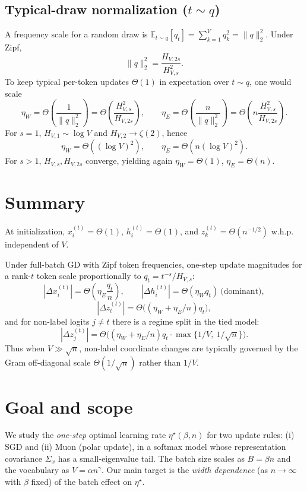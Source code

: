 \documentclass[11pt]{article}
\begin{document}
\subsection{Typical-draw normalization ($t\sim q$)}
A frequency scale for a random draw is $\mathbb{E}_{t\sim q}[q_t]=\sum_{k=1}^V q_k^2=\|q\|_2^2$.
Under Zipf,
\[
\|q\|_2^2 = \frac{H_{V,2s}}{H_{V,s}^2}.
\]
To keep typical per-token updates $\Theta(1)$ in expectation over $t\sim q$, one would scale
\[
\eta_W = \Theta\!\left(\frac{1}{\|q\|_2^2}\right)=\Theta\!\left(\frac{H_{V,s}^2}{H_{V,2s}}\right),
\qquad
\eta_E = \Theta\!\left(\frac{n}{\|q\|_2^2}\right)=\Theta\!\left(n\frac{H_{V,s}^2}{H_{V,2s}}\right).
\]
For $s=1$, $H_{V,1}\sim \log V$ and $H_{V,2}\to \zeta(2)$, hence
\[
\eta_W=\Theta((\log V)^2),\qquad \eta_E=\Theta(n(\log V)^2).
\]
For $s>1$, $H_{V,s},H_{V,2s}$ converge, yielding again $\eta_W=\Theta(1)$, $\eta_E=\Theta(n)$.

\section{Summary}

At initialization, $x^{(t)}_i=\Theta(1)$, $h^{(t)}_i=\Theta(1)$, and $z^{(t)}_k=\Theta(n^{-1/2})$ w.h.p.
independent of $V$.

Under full-batch GD with Zipf token frequencies, one-step update magnitudes for a rank-$t$ token
scale proportionally to $q_t=t^{-s}/H_{V,s}$:
\[
|\Delta x^{(t)}_i|=\Theta\!\left(\eta_E \frac{q_t}{n}\right),\qquad
|\Delta h^{(t)}_i|=\Theta(\eta_W q_t)\ \text{(dominant)},
\]
\[
|\Delta z^{(t)}_t|=\Theta\!\Big((\eta_W+\eta_E/n)q_t\Big),
\]
and for non-label logits $j\neq t$ there is a regime split in the tied model:
\[
|\Delta z^{(t)}_j|=\Theta\!\Big((\eta_W+\eta_E/n)q_t\cdot \max\{1/V,\ 1/\sqrt{n}\}\Big).
\]
Thus when $V\gg \sqrt{n}$, non-label coordinate changes are typically governed by the
Gram off-diagonal scale $\Theta(1/\sqrt{n})$ rather than $1/V$.

\section{Goal and scope}

We study the \emph{one-step} optimal learning rate $\eta^\star(\beta,n)$ for two update rules:
(i) SGD and (ii) Muon (polar update), in a softmax model whose representation covariance $\Sigma_x$ has a small-eigenvalue tail.
The batch size scales as $B=\beta n$ and the vocabulary as $V=\alpha n^\gamma$.
Our main target is the \emph{width dependence} (as $n\to\infty$ with $\beta$ fixed) of the batch effect on $\eta^\star$.
\end{document}
